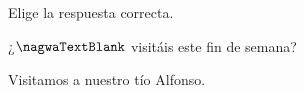 
\begin{question}

\begin{instance}
    
\begin{mcq}[standalone=false]
      
\begin{stem}
        Elige la respuesta correcta.\par
        
\begin{enumerationnolabel}
          \item{¿$\nagwaTextBlank$ visitáis este fin de semana?}          \item{Visitamos a nuestro tío Alfonso.}        
\end{enumerationnolabel}
      
\end{stem}
      
\begin{distractors}
\end{distractors}
                      
\end{mcq}
  
\end{instance}

\end{question}
